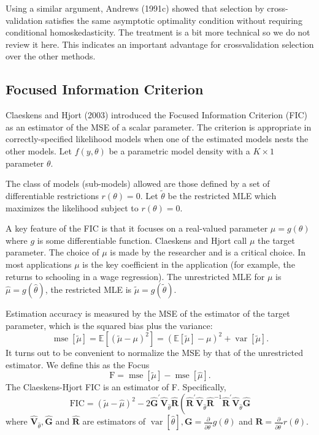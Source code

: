 \documentclass[10pt]{article}
\begin{document}
Using a similar argument, Andrews (1991c) showed that selection by cross-validation satisfies the same asymptotic optimality condition without requiring conditional homoskedasticity. The treatment is a bit more technical so we do not review it here. This indicates an important advantage for crossvalidation selection over the other methods.

\subsection{Focused Information Criterion}
Claeskens and Hjort (2003) introduced the Focused Information Criterion (FIC) as an estimator of the MSE of a scalar parameter. The criterion is appropriate in correctly-specified likelihood models when one of the estimated models nests the other models. Let $f(y, \theta)$ be a parametric model density with a $K \times 1$ parameter $\theta$.

The class of models (sub-models) allowed are those defined by a set of differentiable restrictions $r(\theta)=0$. Let $\widetilde{\theta}$ be the restricted MLE which maximizes the likelihood subject to $r(\theta)=0$.

A key feature of the FIC is that it focuses on a real-valued parameter $\mu=g(\theta)$ where $g$ is some differentiable function. Claeskens and Hjort call $\mu$ the target parameter. The choice of $\mu$ is made by the researcher and is a critical choice. In most applications $\mu$ is the key coefficient in the application (for example, the returns to schooling in a wage regression). The unrestricted MLE for $\mu$ is $\widehat{\mu}=g(\widehat{\theta})$, the restricted MLE is $\widetilde{\mu}=g(\widetilde{\theta})$.

Estimation accuracy is measured by the MSE of the estimator of the target parameter, which is the squared bias plus the variance:
$$
\operatorname{mse}[\widetilde{\mu}]=\mathbb{E}\left[(\widetilde{\mu}-\mu)^{2}\right]=(\mathbb{E}[\widetilde{\mu}]-\mu)^{2}+\operatorname{var}[\widetilde{\mu}] .
$$
It turns out to be convenient to normalize the MSE by that of the unrestricted estimator. We define this as the Focus
$$
\mathrm{F}=\operatorname{mse}[\widetilde{\mu}]-\operatorname{mse}[\widehat{\mu}] .
$$
The Claeskens-Hjort FIC is an estimator of F. Specifically,
$$
\mathrm{FIC}=(\widetilde{\mu}-\widehat{\mu})^{2}-2 \widehat{\boldsymbol{G}}^{\prime} \widehat{\boldsymbol{V}}_{\widehat{\theta}} \widehat{\boldsymbol{R}}\left(\widehat{\boldsymbol{R}}^{\prime} \widehat{\boldsymbol{V}}_{\widehat{\theta}} \widehat{\boldsymbol{R}}^{-1} \widehat{\boldsymbol{R}}^{\prime} \widehat{\boldsymbol{V}}_{\widehat{\theta}} \widehat{\boldsymbol{G}}\right.
$$
where $\widehat{\boldsymbol{V}}_{\widehat{\theta}}, \widehat{\boldsymbol{G}}$ and $\widehat{\boldsymbol{R}}$ are estimators of $\operatorname{var}[\widehat{\theta}], \boldsymbol{G}=\frac{\partial}{\partial \theta^{\prime}} g(\theta)$ and $\boldsymbol{R}=\frac{\partial}{\partial \theta^{\prime}} r(\theta)$.
\end{document}
